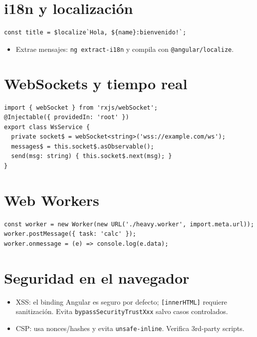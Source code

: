 \documentclass[11pt,a4paper]{article}
\begin{document}
\section{i18n y localización}
\begin{lstlisting}[style=tsstyle, caption={Marcado con \$localize y runtime i18n}]
const title = $localize`Hola, ${name}:bienvenido!`;
\end{lstlisting}
\begin{itemize}[leftmargin=*]
  \item Extrae mensajes: \texttt{ng extract-i18n} y compila con \texttt{@angular/localize}.
\end{itemize}

\section{WebSockets y tiempo real}
\begin{lstlisting}[style=tsstyle, caption={Servicio con WebSocketSubject}]
import { webSocket } from 'rxjs/webSocket';
@Injectable({ providedIn: 'root' })
export class WsService {
  private socket$ = webSocket<string>('wss://example.com/ws');
  messages$ = this.socket$.asObservable();
  send(msg: string) { this.socket$.next(msg); }
}
\end{lstlisting}

\section{Web Workers}
\begin{lstlisting}[style=tsstyle, caption={Creación y comunicación con Worker}]
const worker = new Worker(new URL('./heavy.worker', import.meta.url));
worker.postMessage({ task: 'calc' });
worker.onmessage = (e) => console.log(e.data);
\end{lstlisting}

\section{Seguridad en el navegador}
\begin{itemize}[leftmargin=*]
  \item XSS: el binding Angular es seguro por defecto; \texttt{[innerHTML]} requiere sanitización. Evita \texttt{bypassSecurityTrustXxx} salvo casos controlados.
  \item CSP: usa nonces/hashes y evita \texttt{unsafe-inline}. Verifica 3rd-party scripts.
\end{itemize}
\end{document}
